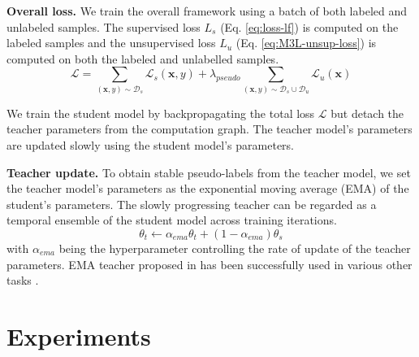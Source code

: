 \documentclass[10pt,twocolumn,letterpaper]{article}
\begin{document}
\noindent\textbf{Overall loss.}
We train the overall framework using a batch of both labeled and unlabeled samples. The supervised loss $L_s$ (Eq. \ref{eq:loss-lf}) is computed on the labeled samples and the unsupervised loss $L_u$ (Eq. \ref{eq:M3L-unsup-loss}) is computed on both the labeled and unlabelled samples. 
\begin{equation}
    \mathcal{L} = \sum_{(\mathbf{x}, y)\sim \mathcal{D}_s} \mathcal{L}_s(\mathbf{x}, y) + \lambda_{pseudo}\sum_{(\mathbf{x}, y)\sim \mathcal{D}_s \cup \mathcal{D}_u} \mathcal{L}_u(\mathbf{x})
    \label{eq:M3L-total-loss}
\end{equation}

We train the student model by backpropagating the total loss $\mathcal{L}$ but detach the teacher parameters from the computation graph. The teacher model's parameters are updated slowly using the student model's parameters. 

\noindent\textbf{Teacher update.}
To obtain stable pseudo-labels from the teacher model, we set the teacher model's parameters as the exponential moving average (EMA) of the student's parameters. The slowly progressing teacher can be regarded as a temporal ensemble of the student model across training iterations.
\begin{equation}
    \theta_t \leftarrow \alpha_{ema}\theta_t + (1-\alpha_{ema})\theta_s
    \label{eq:M3L-teacher-update}
\end{equation}
with $\alpha_{ema}$ being the hyperparameter controlling the rate of update of the teacher parameters. EMA teacher proposed in \cite{mt} has been successfully used in various other tasks \cite{cai2022semi, liu2021unbiased, u2pl, liu2022perturbed}.
 \section{Experiments}
\end{document}
